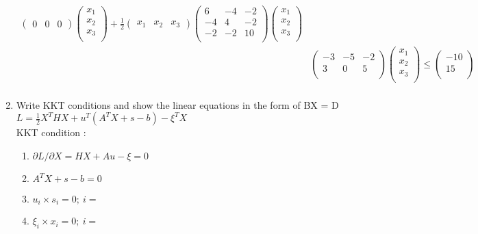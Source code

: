 \documentclass[12pt,a4paper]{report}
\begin{document}
\begin{CJK}{UTF8}{bsmi}
\begin{enumerate}
\begin{align*}
\begin{pmatrix}
		0 &0& 0
		\end{pmatrix}
			\begin{pmatrix}
			x_1 \\
			x_2\\
			x_3\\
			\end{pmatrix}
		 +\frac12
		 \begin{pmatrix}
		 x_1 &x_2 &x_3
		 \end{pmatrix}
		 \begin{pmatrix}
		 6 &-4 &-2\\
		 -4 &4 &-2\\
		 -2 &-2& 10\\
		 \end{pmatrix}
			\begin{pmatrix}
			x_1 \\
			x_2\\
			x_3\\
			\end{pmatrix}\\
		&\begin{pmatrix}
			-3& -5 &-2 \\
			3& 0& 5 \\
			\end{pmatrix}
			\begin{pmatrix}
			x_1 \\
			x_2\\
			x_3\\
			\end{pmatrix}
			\leq
			\begin{pmatrix}
			-10 \\
			15 \\
			\end{pmatrix}\\
		\end{align*}
		\newpage
		\item Write KKT conditions and show the linear equations in the form of BX = D \\ \vspace{4mm}
			$	L = \frac12X^THX+u^T(A^TX+s-b) - \xi ^TX $\\ \vspace{3mm}
			KKT condition :
			\begin{enumerate}
				\item $\partial L/ \partial X = HX + Au - \xi = 0  $
				\item $A^TX+s-b = 0 $
				\item $u_i\times s_i = 0;\   i=$ 
				\item $\xi _i\times x_i = 0;\   i=$ 

\end{enumerate}
\end{enumerate}
\end{CJK}
\end{document}
